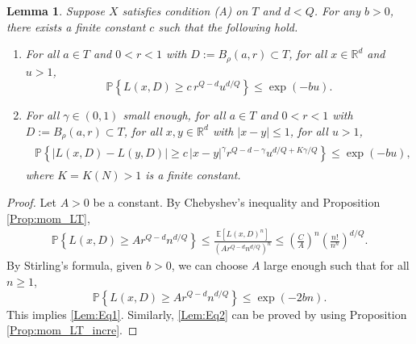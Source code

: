 \documentclass[11pt, reqno]{amsart}
\newtheorem{lemma}[theorem]{Lemma}
\def\R{{\mathbb R}}
\def\E{{\mathbb E}}
\def\P{{\mathbb P}}
\numberwithin{equation}{section}
\begin{document}
\begin{lemma}\label{LT:large_dev}
Suppose $X$ satisfies condition \textup{(A)} on $T$ and $d < Q$. %
For any $b > 0$, there exists a finite constant $c$ such that the following hold.
\begin{enumerate}
\item[(i)] For all $a \in T$ and $0 < r < 1$ with $D:=B_\rho(a, r) \subset T$, for all $x \in \R^d$ and $u > 1$,
\begin{equation}\label{Lem:Eq1}
\P\left\{ L(x, D) \ge c\, r^{Q-d} u^{d/Q} \right\} \le \exp(-bu).
\end{equation}
\item[(ii)] For all $\gamma \in (0, 1)$ small enough, for all $a \in T$ and $0 < r < 1$ with 
$D:=B_\rho(a, r) \subset T$, for all $x, y \in \R^d$ with $|x-y|\le 1$, for all $u > 1$,
\begin{align}
\begin{aligned}\label{Lem:Eq2}
\P\left\{|L(x, D) - L(y, D)| \ge c\,|x-y|^{\gamma} r^{Q-d-\gamma}u^{d/Q + K\gamma/Q}\right\} \le \exp(-bu),
\end{aligned}
\end{align}
where $K = K(N) > 1$ is a finite constant.
\end{enumerate}
\end{lemma}

\begin{proof}
Let $A > 0$ be a constant. By Chebyshev's inequality and Proposition \ref{Prop:mom_LT},
\begin{align*}
\P\left\{ L(x, D) \ge A r^{Q-d} n^{d/Q} \right\} 
\le \frac{\E[L(x, D)^n]}{(A r^{Q-d} n^{d/Q})^n}
\le \left(\frac{C}{A}\right)^n \left( \frac{n!}{n^n}\right)^{d/Q}.
\end{align*}
By Stirling's formula, given $b > 0$, we can choose $A$ large enough such that for all $n \ge 1$,
\[ \P\left\{ L(x, D) \ge A r^{Q-d} n^{d/Q} \right\} \le \exp(-2b n). \]
This implies \eqref{Lem:Eq1}.
Similarly, \eqref{Lem:Eq2} can be proved by using Proposition \ref{Prop:mom_LT_incre}.
\end{proof}
\end{document}
